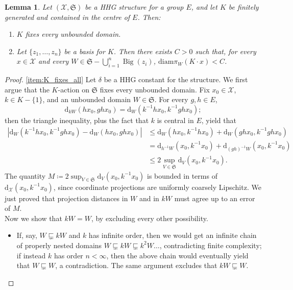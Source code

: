 \documentclass[svgnames]{amsart}
\theoremstyle{plain}
\newtheorem{lemma}[thm]{Lemma}
\theoremstyle{definition}
\newcommand{\cal}[1]{\mathcal{#1}}
\newcommand{\frakS}{\mathfrak{S}}
\newcommand{\Bigdom}[1]{\operatorname{Big}\left(#1\right)}
\newcommand{\diam}{\mathrm{diam}}
\newcommand{\dist}{\mathrm{d}}
\newcommand{\propnest}{\sqsubsetneq}
\begin{document}
\begin{lemma}\label{lem:central_action}
    Let $(\cal X, \frakS)$ be a HHG structure for a group $E$, and let $K$ be finitely generated and contained in the centre of $E$. Then:
    \begin{enumerate}
        \item\label{item:K_fixes_all} $K$ fixes every unbounded domain.
        \item\label{item:K_acts_unif_bdd} Let $\{z_1,\ldots, z_n\}$ be a basis for $K$. Then there exists $C>0$ such that, for every $x\in \cal X $ and every $W\in \frakS-\bigcup_{i=1}^n \Bigdom{z_i}$, $\diam \pi_W(K\cdot x)<C$.
    \end{enumerate}
\end{lemma}

\begin{proof}
    \eqref{item:K_fixes_all} Let $\delta$ be a HHG constant for the structure. We first argue that the $K$-action on $\frakS$ fixes every unbounded domain. Fix $x_0\in \cal X$, $k\in K-\{1\}$, and an unbounded domain $W\in\frakS$. For every $g,h\in E$,
    $$\dist_{kW}(hx_0, ghx_0)=\dist_{W}(k^{-1}hx_0, k^{-1}ghx_0);$$
    then the triangle inequality, plus the fact that $k$ is central in $E$, yield that
    \begin{align*}
        \left|\dist_{W}(k^{-1}hx_0, k^{-1}ghx_0)-\dist_{W}(hx_0, ghx_0)\right|&\le \dist_{W}(hx_0, k^{-1}hx_0)+\dist_{W}(ghx_0, k^{-1}ghx_0)\\
        &=\dist_{h^{-1}W}(x_0, k^{-1}x_0)+\dist_{(gh)^{-1}W}(x_0, k^{-1}x_0)\\
        &\le 2\sup_{V\in \frakS}\dist_{V}(x_0, k^{-1}x_0).
    \end{align*}
    The quantity $M\coloneq 2\sup_{V\in \frakS}\dist_{V}(x_0, k^{-1}x_0)$ is bounded in terms of $\dist_{\cal X}(x_0, k^{-1} x_0)$, since coordinate projections are uniformly coarsely Lipschitz. We just proved that projection distances in $W$ and in $kW$ must agree up to an error of $M$. \\
    Now we show that $kW=W$, by excluding every other possibility.
    \begin{itemize}
        \item If, say, $W\propnest kW$ and $k$ has infinite order, then we would get an infinite chain of properly nested domains $W\propnest kW\propnest k^2W\ldots$, contradicting finite complexity; if instead $k$ has order $n<\infty$, then the above chain would eventually yield that $W\propnest W$, a contradiction. The same argument excludes that $kW\propnest W$.

\end{itemize}
\end{proof}
\end{document}
